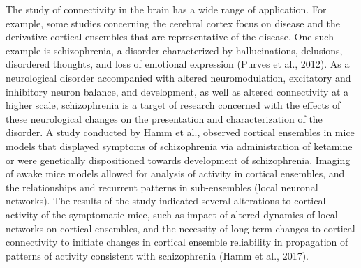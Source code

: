\documentclass[11pt]{article}
\begin{document}
The study of connectivity in the brain has a wide range of application. For example, some studies concerning the cerebral cortex focus on disease and the derivative cortical ensembles that are representative of the disease. One such example is schizophrenia, a disorder characterized by hallucinations, delusions, disordered thoughts, and loss of emotional expression (Purves et al., 2012). As a neurological disorder accompanied with altered neuromodulation, excitatory and inhibitory neuron balance, and development, as well as altered connectivity at a higher scale, schizophrenia is a target of research concerned with the effects of these neurological changes on the presentation and characterization of the disorder. A study conducted by Hamm et al., observed cortical ensembles in mice models that displayed symptoms of schizophrenia via administration of ketamine or were genetically dispositioned towards development of schizophrenia. Imaging of awake mice models allowed for analysis of activity in cortical ensembles, and the relationships and recurrent patterns in sub-ensembles (local neuronal networks). The results of the study indicated several alterations to cortical activity of the symptomatic mice, such as impact of altered dynamics of local networks on cortical ensembles, and the necessity of long-term changes to cortical connectivity to initiate changes in cortical ensemble reliability in propagation of patterns of activity consistent with schizophrenia (Hamm et al., 2017).\par
\end{document}
